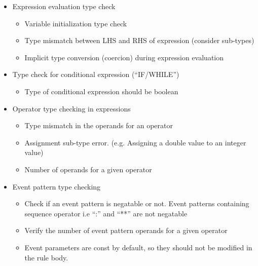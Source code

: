 \documentclass{sigchi}
\begin{document}
\begin{enumerate}
\begin{itemize}
	\item Expression evaluation type check
    	\begin{itemize}
			\item Variable initialization type check
			\item Type mismatch between LHS and RHS of expression (consider sub-types)
			\item Implicit type conversion (coercion) during expression evaluation
		\end{itemize}
	\item Type check for conditional expression (“IF/WHILE”)
    	\begin{itemize}
			\item Type of conditional expression should be boolean
         \end{itemize}
	\item Operator type checking in expressions
		\begin{itemize}
            \item Type mismatch in the operands for an operator
			\item Assignment sub-type error. (e.g. Assigning a double value to an integer value)
			\item Number of operands for a given operator
         \end{itemize}
	\item Event pattern type checking
    	\begin{itemize}
			\item Check if an event pattern is negatable or not. Event patterns containing sequence operator i.e “:” and “**” are not negatable
			\item Verify the number of event pattern operands for a given operator
            \item Event parameters are const by default, so they should not be modified in the rule body.
		\end{itemize}
    \end{itemize}



\end{enumerate}
\end{document}
